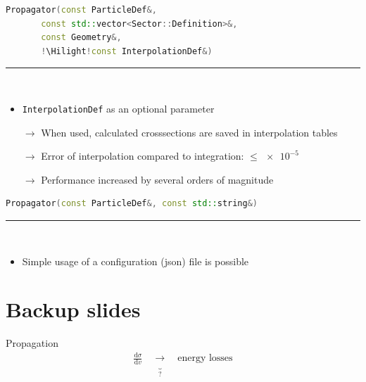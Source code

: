 \documentclass[aspectratio=1610, captions=tableheading, 11pt]{beamer}
\newcommand{\Hilight}{\makebox[0pt][l]{\color{tugreen}\rule[-4pt]{0.65\linewidth}{14pt}}}
\begin{document}
\begin{frame}[fragile]
\begin{lstlisting}[language=C++,basicstyle=\ttfamily,keywordstyle=\color{red}, escapechar=\!]
Propagator(const ParticleDef&,
	   const std::vector<Sector::Definition>&,
	   const Geometry&,
	   !\Hilight!const InterpolationDef&)
\end{lstlisting}
	\textcolor{tugreen}{\rule{\textwidth}{1pt}}\\%
    \begin{itemize}
      \setlength\itemsep{0.5em}
      \item \texttt{InterpolationDef} as an optional parameter
      \item [$\rightarrow$] When used, calculated crosssections are saved in interpolation tables
      \item [$\rightarrow$] Error of interpolation compared to integration: $\leq \num{e-5}$
      \item [$\rightarrow$] Performance increased by several orders of magnitude
    \end{itemize}
\end{frame}

\begin{frame}[fragile]
\begin{lstlisting}[language=C++,basicstyle=\ttfamily,keywordstyle=\color{red}, escapechar=\!]
Propagator(const ParticleDef&, const std::string&)
\end{lstlisting}
	\textcolor{tugreen}{\rule{\textwidth}{1pt}}\\%
    \begin{itemize}
      \setlength\itemsep{0.5em}
      \item Simple usage of a configuration (json) file is possible
    \end{itemize}
\end{frame}


\appendix
\section{Backup slides} 



\begin{frame}{Propagation}
  \Huge
  \begin{align*}
      \frac{\mathrm{d}\sigma}{\mathrm{d}v} \quad \underbrace{\longrightarrow}_{?} \quad \text{energy losses}
  \end{align*}
\end{frame}
\end{document}
